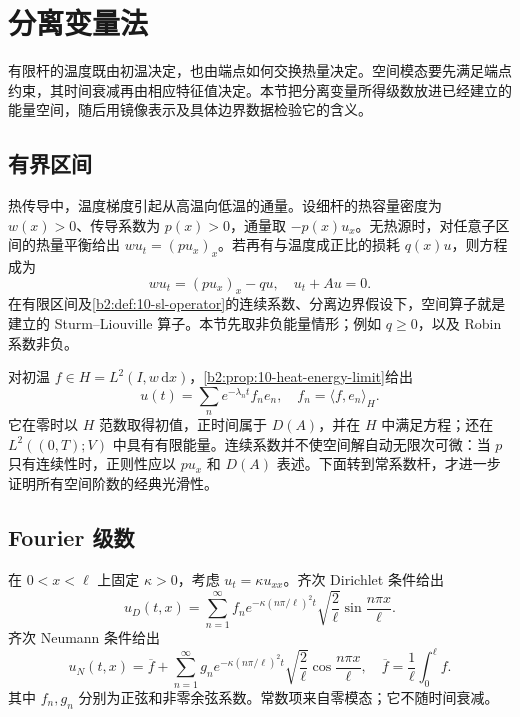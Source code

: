 \section{分离变量法}
\label{b2:sec:1201}

有限杆的温度既由初温决定，也由端点如何交换热量决定。空间模态要先满足端点约束，其时间衰减再由相应特征值决定。本节把分离变量所得级数放进已经建立的能量空间，随后用镜像表示及具体边界数据检验它的含义。

\subsection{有界区间}
\label{b2:subsec:120101}

热传导中，温度梯度引起从高温向低温的通量。设细杆的热容量密度为 \(w(x)>0\)、传导系数为 \(p(x)>0\)，通量取 \(-p(x)u_x\)。无热源时，对任意子区间的热量平衡给出 \(wu_t=(pu_x)_x\)。若再有与温度成正比的损耗 \(q(x)u\)，则方程成为
\[
 wu_t=(pu_x)_x-qu,
 \quad u_t+Au=0.
\]
在有限区间及\cref{b2:def:10-sl-operator}的连续系数、分离边界假设下，空间算子就是建立的 Sturm--Liouville 算子。本节先取非负能量情形；例如 \(q\geq0\)，以及 Robin 系数非负。

\ProseParagraphBreak

对初温 \(f\in H=L^2(I,w\,\mathrm{d}x)\)，\cref{b2:prop:10-heat-energy-limit}给出
\begin{equation}\label{b2:eq:12-interval-expansion}
 u(t)=\sum_ne^{-\lambda_nt}f_ne_n,
 \quad f_n=\langle f,e_n\rangle_H.
\end{equation}
它在零时以 \(H\) 范数取得初值，正时间属于 \(D(A)\)，并在 \(H\) 中满足方程；还在 \(L^2((0,T);V)\) 中具有有限能量。连续系数并不使空间解自动无限次可微：当 \(p\) 只有连续性时，正则性应以 \(pu_x\) 和 \(D(A)\) 表述。下面转到常系数杆，才进一步证明所有空间阶数的经典光滑性。

\subsection{Fourier 级数}
\label{b2:subsec:120102}

在 \(0<x<\ell\) 上固定 \(\kappa>0\)，考虑 \(u_t=\kappa u_{xx}\)。齐次 Dirichlet 条件给出
\begin{equation}\label{b2:eq:12-dirichlet-series}
 u_D(t,x)=\sum_{n=1}^\infty f_ne^{-\kappa(n\pi/\ell)^2t}
 \sqrt{\dfrac2\ell}\sin\dfrac{n\pi x}{\ell}.
\end{equation}
齐次 Neumann 条件给出
\begin{equation}\label{b2:eq:12-neumann-series}
 u_N(t,x)=\overline f+
 \sum_{n=1}^\infty g_ne^{-\kappa(n\pi/\ell)^2t}
 \sqrt{\dfrac2\ell}\cos\dfrac{n\pi x}{\ell},
 \quad\overline f=\dfrac1\ell\int_0^\ell f.
\end{equation}
其中 \(f_n,g_n\) 分别为正弦和非零余弦系数。常数项来自零模态；它不随时间衰减。

